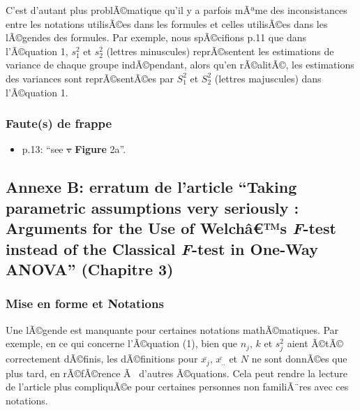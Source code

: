 \begin{appendix}
C'est d'autant plus problÃ©matique qu'il y a parfois mÃªme des
inconsistances entre les notations utilisÃ©es dans les formules et
celles utilisÃ©es dans les lÃ©gendes des formules. Par exemple, nous
spÃ©cifions p.11 que dans l'Ã©quation 1, \(s^2_1\) et \(s^2_2\) (lettres
minuscules) reprÃ©sentent les estimations de variance de chaque groupe
indÃ©pendant, alors qu'en rÃ©alitÃ©, les estimations des variances sont
reprÃ©sentÃ©es par \(S^2_1\) et \(S^2_2\) (lettres majuscules) dans
l'Ã©quation 1.

\hypertarget{fautes-de-frappe}{%
\subsubsection{Faute(s) de frappe}\label{fautes-de-frappe}}

\begin{itemize}
\tightlist
\item
  p.13: ``see \sout{v} \textbf{Figure} 2a''.
\end{itemize}

\newpage

\hypertarget{annexe-b-erratum-de-larticle-taking-parametric-assumptions-very-seriously-arguments-for-the-use-of-welchuxe2s-f-test-instead-of-the-classical-f-test-in-one-way-anova-chapitre-3}{%
\subsection{\texorpdfstring{Annexe B: erratum de l'article ``Taking
parametric assumptions very seriously : Arguments for the Use of
Welchâ€™s \emph{F}-test instead of the Classical \emph{F}-test in
One-Way ANOVA'' (Chapitre
3)}{Annexe B: erratum de l'article ``Taking parametric assumptions very seriously : Arguments for the Use of Welchâ€™s F-test instead of the Classical F-test in One-Way ANOVA'' (Chapitre 3)}}\label{annexe-b-erratum-de-larticle-taking-parametric-assumptions-very-seriously-arguments-for-the-use-of-welchuxe2s-f-test-instead-of-the-classical-f-test-in-one-way-anova-chapitre-3}}

\hypertarget{mise-en-forme-et-notations-1}{%
\subsubsection{Mise en forme et
Notations}\label{mise-en-forme-et-notations-1}}

Une lÃ©gende est manquante pour certaines notations mathÃ©matiques. Par
exemple, en ce qui concerne l'Ã©quation (1), bien que \(n_j\), \(k\) et
\(s^2_j\) aient Ã©tÃ© correctement dÃ©finis, les dÃ©finitions pour
\(\bar{x_j}\), \(\bar{x_{..}}\) et \(N\) ne sont donnÃ©es que plus tard,
en rÃ©fÃ©rence Ã~ d'autres Ã©quations. Cela peut rendre la lecture de
l'article plus compliquÃ©e pour certaines personnes non familiÃ¨res avec
ces notations.


\end{appendix}
